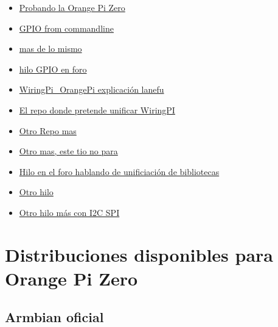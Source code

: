 \documentclass[12pt,spanish,]{scrartcl}
\providecommand{\tightlist}{%
  \setlength{\itemsep}{0pt}\setlength{\parskip}{0pt}}
\begin{document}
\begin{itemize}
\tightlist
\item
  \href{http://harald.studiokubota.com/wordpress/index.php/2016/11/19/orange-pi-zero-neat/}{Probando
  la Orange Pi Zero}
\item
  \href{http://falsinsoft.blogspot.com.es/2012/11/access-gpio-from-linux-user-space.html}{GPIO
  from commandline}
\item
  \href{http://www.emcraft.com/stm32f429discovery/controlling-gpio-from-linux-user-space}{mas
  de lo mismo}
\item
  \href{https://forum.armbian.com/index.php/topic/3084-orange-pi-zero-python-gpio-library/}{hilo
  GPIO en foro}
\item
  \href{https://gist.github.com/lanefu/f16a67195c9fa35c466c6b50cdaeadea}{WiringPi\_OrangePi
  explicación lanefu}
\item
  \href{https://github.com/lanefu/WiringOtherPi}{El repo donde pretende
  unificar WiringPI}
\item
  \href{https://github.com/lanefu/WiringPi-Python-OP}{Otro Repo mas}
\item
  \href{https://gist.github.com/lanefu/f16a67195c9fa35c466c6b50cdaeadea}{Otro
  mas, este tio no para}
\item
  \href{https://forum.armbian.com/index.php/topic/2956-559-gpio-support-for-h2h3-boards-with-a-unified-wiringpi-library-in-a-neat-little-package/\#entry20311}{Hilo
  en el foro hablando de unificiación de bibliotecas}
\item
  \href{https://forum.armbian.com/index.php/topic/3084-orange-pi-zero-python-gpio-library/?hl=\%2Bzero+\%2Bgpio+\%2Blibrary}{Otro
  hilo}
\item
  \href{https://forum.armbian.com/index.php/topic/3084-orange-pi-zero-python-gpio-library/}{Otro
  hilo más con I2C SPI}
\end{itemize}

\hypertarget{distribuciones-disponibles-para-orange-pi-zero}{%
\section{Distribuciones disponibles para Orange Pi
Zero}\label{distribuciones-disponibles-para-orange-pi-zero}}

\hypertarget{armbian-oficial}{%
\subsection{Armbian oficial}\label{armbian-oficial}}
\end{document}
